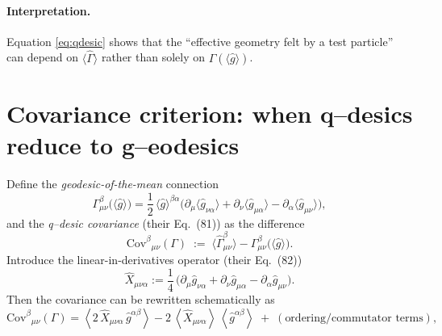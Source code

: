 \documentclass[11pt,a4paper]{article}
\theoremstyle{thmstyleone}
\theoremstyle{thmstyletwo}
\theoremstyle{thmstylethree}
\begin{document}
            \paragraph{Interpretation.}
                Equation \eqref{eq:qdesic} shows that the ``effective geometry felt by a test particle'' can depend on
                $\langle \hat\Gamma\rangle$ rather than solely on $\Gamma(\langle \hat g\rangle)$.

        \section{Covariance criterion: when q--desics reduce to g--eodesics}
        Define the \emph{geodesic-of-the-mean} connection
        \begin{equation}
            \Gamma^\beta_{\mu\nu}\big(\langle \hat g\rangle\big)
            =
            \frac{1}{2}\,\langle \hat g\rangle^{\beta\alpha}\big(
            \partial_\mu \langle \hat g_{\nu\alpha}\rangle
            +
            \partial_\nu \langle \hat g_{\mu\alpha}\rangle
            -
            \partial_\alpha \langle \hat g_{\mu\nu}\rangle
            \big),
        \end{equation}
        and the \emph{q--desic covariance} (their Eq.\ (81)) as the difference
        \begin{equation}
            \mathrm{Cov}^{\beta}{}_{\mu\nu}(\Gamma)
            \;:=\;
            \big\langle \hat\Gamma^\beta_{\mu\nu}\big\rangle
            -
            \Gamma^\beta_{\mu\nu}\!\big(\langle \hat g\rangle\big).
            \label{eq:Cov_def}
        \end{equation}
        Introduce the linear-in-derivatives operator (their Eq.\ (82))
        \begin{equation}
            \hat X_{\mu\nu\alpha}
            :=\frac{1}{4}\,\big(\partial_\mu \hat g_{\nu\alpha} + \partial_\nu \hat g_{\mu\alpha} - \partial_\alpha \hat g_{\mu\nu}\big).
            \label{eq:X_def}
        \end{equation}
        Then the covariance can be rewritten schematically as
        \begin{equation}
            \mathrm{Cov}^{\beta}{}_{\mu\nu}(\Gamma)
            =
            \left\langle 2\,\hat X_{\mu\nu\alpha}\,\hat g^{\alpha\beta}\right\rangle
            -
            2\,\left\langle \hat X_{\mu\nu\alpha}\right\rangle\,\left\langle \hat g^{\alpha\beta}\right\rangle
            \;+\;(\text{ordering/commutator terms}),
        \end{equation}
\end{document}
